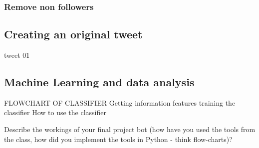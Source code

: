 \subsubsection{Remove non followers}

\subsection{Creating an original tweet}
tweet 01

\subsection{Machine Learning and data analysis}
FLOWCHART OF CLASSIFIER
Getting information
features
training the classifier
How to use the classifier


Describe the workings of your final project bot (how have you used the tools from the class, how did you implement the tools in Python - think flow-charts)?\\